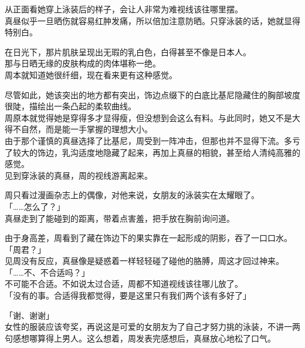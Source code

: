 从正面看她穿上泳装后的样子，会让人非常为难视线该往哪里摆。\\

真昼似乎一旦晒伤就容易红肿发痛，所以倍加注意防晒。只穿泳装的话，她就显得特别白。

在日光下，那片肌肤呈现出无瑕的乳白色，白得甚至不像是日本人。\\

那与日晒无缘的皮肤构成的肉体堪称一绝。\\

周本就知道她很纤细，现在看来更有这种感觉。

尽管如此，她该突出的地方都有突出，饰边点缀下的白底比基尼隐藏住的胸部坡度很陡，描绘出一条凸起的柔软曲线。\\

周原本就觉得她是穿得多才显得瘦，但没想到会这么有料。与此同时，她又不是大得不自然，而是能一手掌握的理想大小。\\

由于那个谨慎的真昼选择了比基尼，周受到一阵冲击，但那也并不显得下流。多亏了较大的饰边，乳沟适度地隐藏了起来，再加上真昼的相貌，甚至给人清纯高雅的感觉。\\

见到穿泳装的真昼，周的视线游离起来。

周只看过漫画杂志上的偶像，对他来说，女朋友的泳装实在太耀眼了。\\

「……怎么了？」\\

真昼走到了能碰到的距离，带着点害羞，把手放在胸前询问道。

由于身高差，周看到了藏在饰边下的果实靠在一起形成的阴影，吞了一口口水。\\

「周君？」\\

见周没有反应，真昼像是疑惑着一样轻轻碰了碰他的胳膊，周这才回过神来。\\

「……不、不合适吗？」\\

不可能不合适。不如说太过合适，周都不知道视线该往哪儿放了。\\

「没有的事。合适得我都觉得，要是这里只有我们两个该有多好了」

「谢、谢谢」\\

女性的服装应该夸奖，再说这是可爱的女朋友为了自己才努力挑的泳装，不讲一两句感想哪算得上男人。这么想着，周发表完感想后，真昼放心地松了口气。\\

